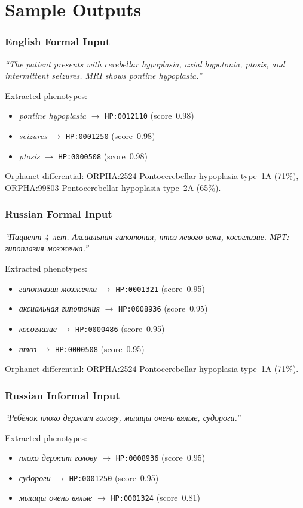 \documentclass[11pt,a4paper]{article}
\begin{document}
\section{Sample Outputs}

\subsubsection*{English Formal Input}

\textit{``The patient presents with cerebellar hypoplasia, axial hypotonia,
ptosis, and intermittent seizures.  MRI shows pontine hypoplasia.''}

\medskip
\noindent Extracted phenotypes:
\begin{itemize}[nosep]
  \item \textit{pontine hypoplasia} $\to$ \texttt{HP:0012110} (score~0.98)
  \item \textit{seizures} $\to$ \texttt{HP:0001250} (score~0.98)
  \item \textit{ptosis} $\to$ \texttt{HP:0000508} (score~0.98)
\end{itemize}

\noindent Orphanet differential:
ORPHA:2524 Pontocerebellar hypoplasia type~1A (71\%),
ORPHA:99803 Pontocerebellar hypoplasia type~2A (65\%).

\subsubsection*{Russian Formal Input}

\textit{``Пациент 4~лет.  Аксиальная гипотония, птоз левого века, косоглазие.
МРТ: гипоплазия мозжечка.''}

\medskip
\noindent Extracted phenotypes:
\begin{itemize}[nosep]
  \item \textit{гипоплазия мозжечка} $\to$ \texttt{HP:0001321} (score~0.95)
  \item \textit{аксиальная гипотония} $\to$ \texttt{HP:0008936} (score~0.95)
  \item \textit{косоглазие} $\to$ \texttt{HP:0000486} (score~0.95)
  \item \textit{птоз} $\to$ \texttt{HP:0000508} (score~0.95)
\end{itemize}

\noindent Orphanet differential:
ORPHA:2524 Pontocerebellar hypoplasia type~1A (71\%).

\subsubsection*{Russian Informal Input}

\textit{``Ребёнок плохо держит голову, мышцы очень вялые, судороги.''}

\medskip
\noindent Extracted phenotypes:
\begin{itemize}[nosep]
  \item \textit{плохо держит голову} $\to$ \texttt{HP:0008936} (score~0.95)
  \item \textit{судороги} $\to$ \texttt{HP:0001250} (score~0.95)
  \item \textit{мышцы очень вялые} $\to$ \texttt{HP:0001324} (score~0.81)
\end{itemize}
\end{document}
